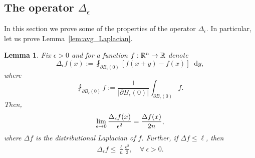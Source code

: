 \documentclass[10pt,a4paper]{amsart}
\newcommand{\R}{\mathbb R}
\newcommand{\dd}{n}
\newcommand*\diff{\mathop{}\!\mathrm{d}}
\newcommand{\avgint}{\fint}
\renewcommand*{\to}{\mathchoice{\longrightarrow}{\rightarrow}{\rightarrow}{\rightarrow}}
\let\oldforall\forall
\renewcommand*{\forall}{\mathrel{\oldforall}}
\newtheorem{lemm}[theo]{Lemma}
\theoremstyle{definition}\newtheorem{defi}[theo]{Definition}
\begin{document}
\subsection{The operator \texorpdfstring{$\Delta_{\epsilon}$}{Delta\_ epsilon}}\label{subsec:appendix_Delta_eps}
In this section we prove some of the properties of the operator $\Delta_{\epsilon}$. In particular, let us prove Lemma~\ref{lem:avg_Laplacian}.
\begin{lemm}\label{lem:avg_Laplacian_appendix}
Fix $\epsilon> 0$ and for a function $f:\R^{\dd}\to\R$ denote
\[
\Delta_{\epsilon}f(x):=\avgint_{\partial B_{\epsilon}(0)}[f(x+y)-f(x)]\diff y,
\]
where
\[
\avgint_{\partial B_{\epsilon}(0)}f:=\frac{1}{|\partial B_{\epsilon}(0)|}\int_{\partial B_{\epsilon}(0)}f.
\]
Then,
\begin{align}\label{eq:Delta_eps_lim_appendix}
\lim_{\epsilon\to 0}\frac{\Delta_{\epsilon}f(x)}{\epsilon^{2}}=\frac{\Delta f(x)}{2\dd},
\end{align}
where $\Delta f$ is the distributional Laplacian of $f$. Further, if $\Delta f\le \ell$, then
\begin{align}\label{eq:Delta_eps_bound_appendix}
\Delta_{\epsilon}f\le \frac{\ell}{\dd}\frac{\epsilon^2}{2},\quad \forall~\epsilon>0.
\end{align}
\end{lemm}
\end{document}
